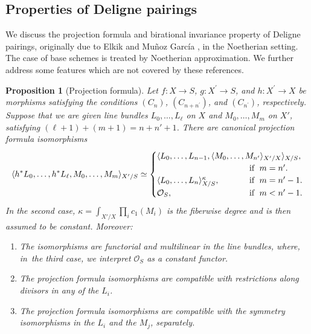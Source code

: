 \documentclass[11pt]{article}
\theoremstyle{plain}
\newtheorem{proposition}[theorem]{Proposition}
\theoremstyle{definition}
\newcommand{\Ocal}{\mathcal O}
\begin{document}
\subsection{Properties of Deligne pairings}
We discuss the projection formula and birational invariance property of Deligne pairings, originally due to Elkik \cite{Elkikfib} and Muñoz García \cite{Munoz}, in the Noetherian setting. The case of base schemes is treated by Noetherian approximation. We further address some features which are not covered by these references.

\begin{proposition}[Projection formula]\label{prop:projformuladeli}
Let $f\colon X\!\to\! S$, $g\colon X^{\prime}\!\to\! S$, and \hbox{$h\colon X^{\prime}\!\to\! X$} be morphisms satisfying the conditions $(C_{n})$, $(C_{n+n^{\prime}})$, and $(C_{n^{\prime}})$, respectively. Suppose that we are given line bundles $L_0, \ldots, L_\ell$ on $X$ and $M_{0}, \ldots, M_{m}$ on $X'$, satisfying $(\ell+1)+(m+1)=n+n'+1$. There are canonical projection formula isomorphisms
\begin{displaymath}
\langle h^\ast L_0, \ldots, h^\ast L_\ell, M_{0}, \ldots, M_{m} \rangle_{X'/S} \simeq
\begin{cases}
\langle L_0, \ldots, L_{n-1}, \langle M_{0}, \ldots, M_{n'} \rangle_{X'/X} \rangle_{X/S},\\
& \hspace*{-2.5cm}\text{if }\; m = n'.\\
\langle L_0, \ldots, L_{n} \rangle_{X/S}^{\kappa},
& \hspace*{-2.5cm}\text{if }\; m= n'-1.\\
\Ocal_S, & \hspace*{-2.5cm}\text{if }\; m < n'-1.
\end{cases}
\end{displaymath}
In the second case, $\kappa = \int_{X'/X} \prod_{i} c_1(M_i)$ is the fiberwise degree and is then assumed to be constant. Moreover:
\begin{enumerate}
\item The isomorphisms are functorial and multilinear in the line bundles, where, in~the third case, we interpret $\Ocal_S$ as a constant functor.
\item The projection formula isomorphisms are compatible with restrictions along divisors in any of the $L_i$.
\item The projection formula isomorphisms are compatible with the symmetry isomorphisms in the $L_{i}$ and the $M_{j}$, separately.
\end{enumerate}
\end{proposition}
\end{document}

